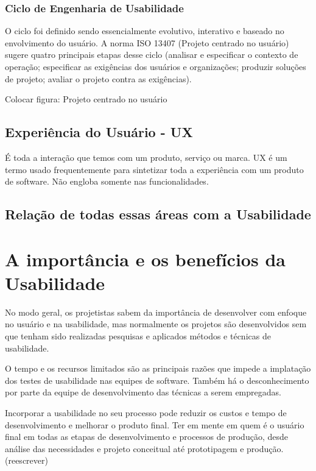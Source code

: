 \subsubsection{Ciclo de Engenharia de Usabilidade}

	O ciclo foi definido sendo essencialmente evolutivo, interativo e baseado no envolvimento do usuário. A norma ISO 13407 (Projeto centrado no usuário) sugere quatro principais etapas desse ciclo (analisar e especificar o contexto de operação; especificar as exigências dos usuários e organizações; produzir soluções de projeto; avaliar o projeto contra as exigências). ~\cite{cybis2010}

Colocar figura: Projeto centrado no usuário

\subsection{Experiência do Usuário - UX}
É toda a interação que temos com um produto, serviço ou marca.
UX é um termo usado frequentemente para sintetizar toda a experiência com um produto de software. Não engloba  somente nas funcionalidades. ~\cite{travis2013}


\subsection{Relação de todas essas áreas com a Usabilidade}

\section{A importância e os benefícios da Usabilidade}

No modo geral, os projetistas sabem da importância de desenvolver com enfoque no usuário e na usabilidade, mas normalmente os projetos são desenvolvidos sem que tenham sido realizadas pesquisas e aplicados métodos e técnicas de usabilidade.
	
	O tempo e os recursos limitados são as principais razões que impede a implatação dos testes de usabilidade nas equipes de software. Também há o desconhecimento por parte da equipe de desenvolvimento das técnicas a serem empregadas.

Incorporar a usabilidade no seu processo pode reduzir os custos e tempo de desenvolvimento e melhorar o produto final. Ter em mente  em quem é o usuário final em todas as etapas de desenvolvimento e processos de produção, desde análise das necessidades e projeto conceitual até prototipagem e produção.  (reescrever)

